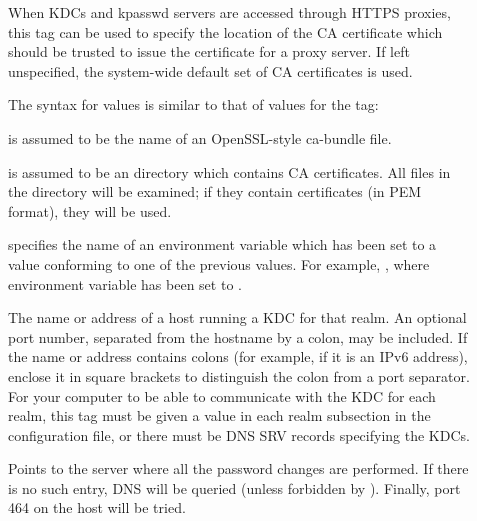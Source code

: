 \documentclass[letterpaper,10pt,english]{sphinxmanual}
\begin{document}
\begin{description}
\item[{}] \leavevmode
When KDCs and kpasswd servers are accessed through HTTPS proxies, this tag
can be used to specify the location of the CA certificate which should be
trusted to issue the certificate for a proxy server.  If left unspecified,
the system-wide default set of CA certificates is used.

The syntax for values is similar to that of values for the
 tag:

 

 is assumed to be the name of an OpenSSL-style ca-bundle file.

 

 is assumed to be an directory which contains CA certificates.
All files in the directory will be examined; if they contain certificates
(in PEM format), they will be used.

 

 specifies the name of an environment variable which has been set
to a value conforming to one of the previous values.  For example,
, where environment variable  has
been set to .

\item[{}] \leavevmode
The name or address of a host running a KDC for that realm.  An
optional port number, separated from the hostname by a colon, may
be included.  If the name or address contains colons (for example,
if it is an IPv6 address), enclose it in square brackets to
distinguish the colon from a port separator.  For your computer to
be able to communicate with the KDC for each realm, this tag must
be given a value in each realm subsection in the configuration
file, or there must be DNS SRV records specifying the KDCs.

\item[{}] \leavevmode
Points to the server where all the password changes are performed.
If there is no such entry, DNS will be queried (unless forbidden
by ).  Finally, port 464 on the 
host will be tried.


\end{description}
\end{document}
